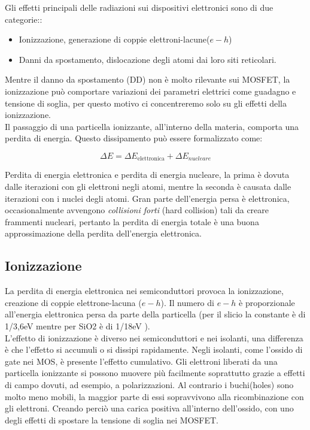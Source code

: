 
Gli effetti principali delle radiazioni sui dispositivi elettronici sono di due categorie:\cite{bib:Effetti_Radiazioni_1987}:
\begin{itemize}
	\item Ionizzazione, generazione di coppie elettroni-lacune($e-h$)
	\item Danni da spostamento, dislocazione degli atomi dai loro siti reticolari.
\end{itemize}
Mentre il danno da spostamento (DD) non è molto rilevante sui MOSFET, la ionizzazione può comportare variazioni dei parametri elettrici come guadagno e tensione di soglia, per questo motivo ci concentreremo solo su gli effetti della ionizzazione.
\\

Il passaggio di una particella ionizzante, all'interno della materia, comporta una perdita di energia. Questo dissipamento può essere formalizzato come:

$$ \Delta E = \Delta E_{\text{elettronica}} + \Delta E_{nucleare} $$

Perdita di energia elettronica e perdita di energia nucleare, la prima è dovuta dalle iterazioni con gli elettroni negli atomi, mentre la seconda è causata dalle iterazioni con i nuclei degli atomi.
Gran parte dell'energia persa è elettronica, occasionalmente avvengono \textit{collisioni forti} (hard collision) tali da creare frammenti nucleari, pertanto la perdita di energia totale è una buona approssimazione della perdita dell'energia elettronica\cite{bib:Effetti_Radiazioni_NASA}.
\\

\subsection{Ionizzazione}
La perdita di energia elettronica nei semiconduttori provoca la ionizzazione, creazione di coppie elettrone-lacuna ($e-h$). Il numero di $e-h$ è proporzionale all'energia elettronica persa da parte della particella (per il slicio la constante è di 1/3,6eV mentre per SiO2 è di 1/18eV \cite{bib:Effetti_Radiazioni_NASA}).
\\

L'effetto di ionizzazione è diverso nei semiconduttori e nei isolanti, una differenza è che l'effetto si accumuli o si dissipi rapidamente.
Negli isolanti, come l'ossido di gate nei MOS, è presente l'effetto cumulativo. Gli elettroni liberati da una particella ionizzante si possono muovere più facilmente soprattutto grazie a effetti di campo dovuti, ad esempio, a polarizzazioni.
Al contrario i buchi(holes) sono molto meno mobili, la maggior parte di essi sopravvivono alla ricombinazione con gli elettroni. Creando perciò una carica positiva all'interno dell'ossido, con uno degli effetti di spostare la tensione di soglia nei MOSFET.
\\

